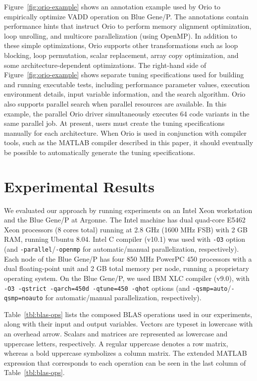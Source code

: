 \documentclass[runningheads]{llncs}
\begin{document}
Figure~\ref{fig:orio-example} shows an annotation example used by Orio to
empirically optimize VADD operation on Blue Gene/P. The annotations contain
performance hints that instruct Orio to perform memory alignment
optimization, loop unrolling, and multicore parallelization (using
OpenMP). In addition to these simple optimizations, Orio supports other
transformations such as loop blocking, loop permutation, scalar replacement,
array copy optimization, and some architecture-dependent optimizations. The
right-hand side of Figure~\ref{fig:orio-example} shows separate tuning
specifications used for building and running executable tests, including
performance parameter values, execution environment details, input variable
information, and the search algorithm. Orio also supports parallel search
when parallel resources are available. In this example, the parallel Orio
driver simultaneously executes 64 code variants in the same parallel job. 
At present, users must create the tuning specifications manually for
each architecture. When Orio is used in conjunction with compiler
tools, such as the MATLAB compiler described in this paper, it should
eventually be possible to automatically generate the tuning
specifications.


\section{Experimental Results}
\label{sec:experiments}

We evaluated our approach by running experiments on an Intel Xeon
workstation and the Blue Gene/P at Argonne. The Intel machine has dual
quad-core E5462 Xeon processors (8 cores total) running at 2.8 GHz
(1600 MHz FSB) with 2 GB RAM, running Ubuntu 8.04. Intel C compiler
(v10.1) was used with \texttt{-O3} option (and
\texttt{-parallel}/\texttt{-openmp} for automatic/manual
parallelization, respectively). Each node of the Blue Gene/P has four
850 MHz PowerPC 450 processors with a dual floating-point unit and 2
GB total memory per node, running a proprietary operating system. On the
Blue Gene/P, we used IBM XLC compiler (v9.0), with \texttt{-O3
-qstrict -qarch=450d -qtune=450 -qhot} options (and
\texttt{-qsmp=auto}/\texttt{-qsmp=noauto} for automatic/manual
parallelization, respectively).

Table~\ref{tbl:blas-ops} lists the composed BLAS operations used in our
experiments, along with their input and output variables. Vectors are typeset
in lowercase with an overhead arrow. Scalars and matrices are represented as
lowercase and uppercase letters, respectively. A regular uppercase denotes a
row matrix, whereas a bold uppercase symbolizes a column matrix. The extended
MATLAB expression that corresponds to each operation can be seen in the last
column of Table~\ref{tbl:blas-ops}.
\end{document}
